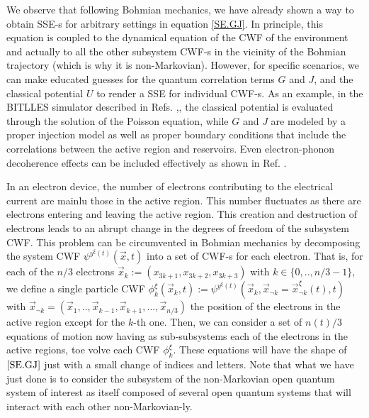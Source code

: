 \documentclass[11pt, a4paper]{article} %
\begin{document}
We observe that following Bohmian mechanics, we have already shown a way to obtain SSE-s for arbitrary settings in equation \eqref{SE.GJ}. In principle, this equation is coupled to the dynamical equation of the CWF of the environment and actually to all the other subsystem CWF-s in the vicinity of the Bohmian trajectory (which is why it is non-Markovian). However, for specific scenarios, we can make educated guesses for the quantum correlation terms $G$ and $J$, and the classical potential $U$ to render a SSE for individual CWF-s. As an example, in the BITLLES simulator described in Refs. \cite{THz},\cite{}, the classical potential is evaluated through the solution of the Poisson equation\cite{}, while $G$ and $J$ are modeled by a proper injection model \cite{} as well as proper boundary conditions \cite{} that include the correlations between the active region and reservoirs. Even electron-phonon decoherence effects can be included effectively as shown in Ref. \cite{}.

In an electron device, the number of electrons contributing to the electrical current are mainlu those in the active region. This number fluctuates as there are electrons entering and leaving the active region. This creation and destruction of electrons leads to an abrupt change in the degrees of freedom of the subsystem CWF. This problem can be circumvented in Bohmian mechanics by decomposing the system CWF $\psi^{y^\xi(t)}(\vec{x},t)$ into a set of CWF-s for each electron. That is, for each of the $n/3$ electrons $\vec{x}_k:=(x_{3k+1}, x_{3k+2}, x_{3k+3})$ with $k\in\{0,..,n/3-1\}$, we define a single particle CWF $\phi_k^\xi(\vec{x}_k, t):=\psi^{y^\xi(t)}(\vec{x}_k, \vec{x}_{\neg k}=\vec{x}_{\neg k}^\xi(t),t)$ with $\vec{x}_{\neg k}=(\vec{x}_1,..,\vec{x}_{k-1}, \vec{x}_{k+1}, ...,\vec{x}_{n/3})$ the position of the electrons in the active region except for the $k$-th one. Then, we can consider a set of $n(t)/3$ equations of motion now having as sub-subsystems each of the electrons in the active regions, toe volve each CWF $\phi_k^\xi$. These equations will have the shape of $\eqref{SE.GJ}$ just with a small change of indices and letters. Note that what we have just done is to consider the subsystem of the non-Markovian open quantum system of interest as itself composed of several open quantum systems that will interact with each other non-Markovian-ly.
\end{document}
